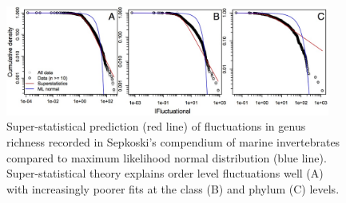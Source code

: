 \documentclass[12pt]{article}
\begin{document}
\begin{figure}[!hp]
  \centering
  \includegraphics[width=0.95\textwidth]{figs/figSupp_sepk_Px.jpg}
  \caption[Super-statistical prediction for Sepkoski's
  compendium]{Super-statistical prediction (red line) of fluctuations
    in genus richness recorded in Sepkoski's compendium of marine
    invertebrates compared to maximum likelihood normal distribution
    (blue line). Super-statistical theory explains order level
    fluctuations well (A) with increasingly poorer fits at the class
    (B) and phylum (C) levels.}
  \label{fig:supp_sepkPx}
\end{figure}
\end{document}
